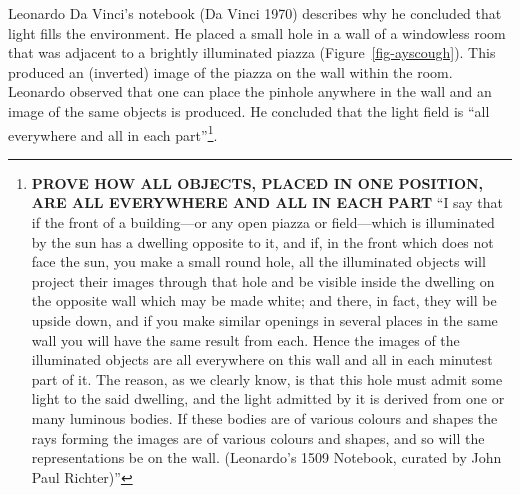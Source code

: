 \documentclass[
  letterpaper,
]{book}
\begin{document}
Leonardo Da Vinci's notebook (Da Vinci 1970) describes why he concluded
that light fills the environment. He placed a small hole in a wall of a
windowless room that was adjacent to a brightly illuminated piazza
(Figure~\ref{fig-ayscough}). This produced an (inverted) image of the
piazza on the wall within the room. Leonardo observed that one can place
the pinhole anywhere in the wall and an image of the same objects is
produced. He concluded that the light field is ``all everywhere and all
in each part''\footnote{\textbf{PROVE HOW ALL OBJECTS, PLACED IN ONE
  POSITION, ARE ALL EVERYWHERE AND ALL IN EACH PART} ``I say that if the
  front of a building---or any open piazza or field---which is
  illuminated by the sun has a dwelling opposite to it, and if, in the
  front which does not face the sun, you make a small round hole, all
  the illuminated objects will project their images through that hole
  and be visible inside the dwelling on the opposite wall which may be
  made white; and there, in fact, they will be upside down, and if you
  make similar openings in several places in the same wall you will have
  the same result from each. Hence the images of the illuminated objects
  are all everywhere on this wall and all in each minutest part of it.
  The reason, as we clearly know, is that this hole must admit some
  light to the said dwelling, and the light admitted by it is derived
  from one or many luminous bodies. If these bodies are of various
  colours and shapes the rays forming the images are of various colours
  and shapes, and so will the representations be on the wall.
  (Leonardo's 1509 Notebook, curated by John Paul Richter)''}.
\end{document}
